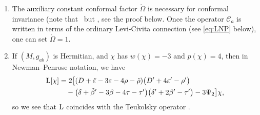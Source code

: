 \documentclass[pdftex]{sigma}
\numberwithin{equation}{section}
\begin{document}
\begin{Remark} \label{remark:OpId}
\quad
\begin{enumerate}\itemsep=0pt
\item
The auxiliary constant conformal factor $\mathring\Omega$ is necessary for conformal invariance \big(note that~ but , see the proof below. Once the operator $\mathcal{C}_{a}$ is written in terms of the ordinary Levi-Civita connection (see \eqref{eq:LNP} below), one can set $\mathring{\Omega}= 1$.
\item\label{item2-2.5}
If $(M,g_{ab})$ is Hermitian, and $\chi$ has $w(\chi)=-3$ and $p(\chi)=4$, then in Newman--Penrose notation, we have
\begin{align} \label{eq:LNP}
{\rm L}[\chi]&{}=2\bigl[(D+\tilde\varepsilon-3\varepsilon-4\rho-\tilde\rho)\bigl(D'+4\varepsilon'-\rho'\bigr) \nonumber \\
&\quad{}
 -\bigl(\delta+\tilde\beta'-3\beta-4\tau-\tau'\bigr)\bigl(\delta'+2\beta'-\tau'\bigr) - 3\Psi_2 \bigr]\chi,
\end{align}
so we see that ${\rm L}$ coincides with the Teukolsky operator \cite[equation~(2.12)]{Teukolsky1973}.
\end{enumerate}
\end{Remark}
\end{document}

